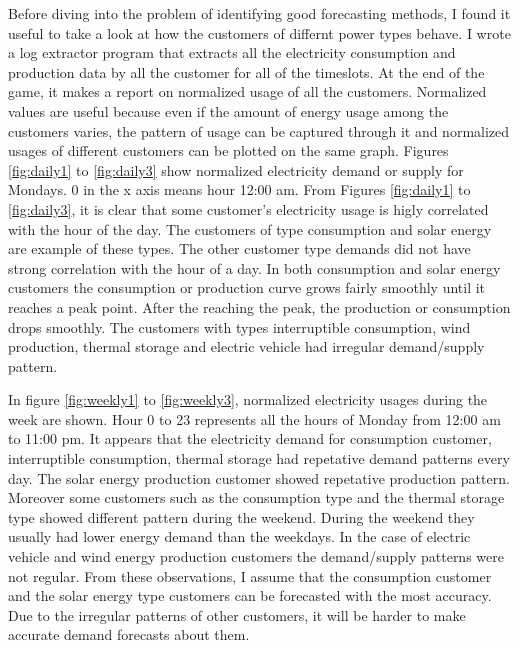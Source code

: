 Before diving into the problem of identifying good forecasting methods, I found it useful to take a look at how the customers of differnt power types behave. I wrote a log extractor program that extracts all the electricity consumption and production data by all the customer for all of the timeslots. At the end of the game, it makes a report on normalized usage of all the customers. Normalized values are useful because even if the amount of energy usage among the customers varies, the pattern of usage can be captured through it and normalized usages of different customers can be plotted on the same graph. Figures \ref{fig:daily1} to \ref{fig:daily3} show normalized electricity demand or supply for Mondays. 0 in the x axis means hour 12:00 am. From Figures \ref{fig:daily1} to \ref{fig:daily3}, it is clear that some customer's electricity usage is higly correlated with the hour of the day. The customers of type consumption and solar energy are example of these types. The other customer type demands did not have strong correlation with the hour of a day. In both consumption and solar energy customers the consumption or production curve grows fairly smoothly until it reaches a peak point. After the reaching the peak, the production or consumption drops smoothly. The customers with types interruptible consumption, wind production, thermal storage and electric vehicle had irregular demand/supply pattern. 

In figure \ref{fig:weekly1} to \ref{fig:weekly3}, normalized electricity usages during the week are shown. Hour 0 to 23 represents all the hours of Monday from 12:00 am to 11:00 pm. It appears that the electricity demand for consumption customer, interruptible consumption, thermal storage had repetative demand patterns every day. The  solar energy production customer showed repetative production pattern. Moreover some customers such as the consumption type and the thermal storage type showed different pattern during the weekend. During the weekend they usually had lower energy demand than the weekdays. In the case of electric vehicle and wind energy production customers the demand/supply patterns were not regular. From these observations, I assume that the consumption customer and the solar energy type customers can be forecasted with the most accuracy. Due to the irregular patterns of other customers, it will be harder to make accurate demand forecasts about them.
 
